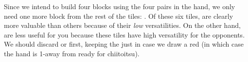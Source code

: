 \emj
Since we intend to build four blocks using the four pairs in the hand, we only need one more block from the rest of the tiles: {\large{}\dong\nan}. Of these six tiles, {\large\dong\nan{}} are clearly more valuable than others because of their \emph{low} versatilities. On the other hand, {\large{}} are less useful for you because these tiles have high versatility for the opponents. We should discard {\large{}} or {\large{}} first, keeping the {\large{}} just in case we draw a red {\large\rfd} (in which case the hand is 1-away from ready for {\jap chiitoitsu}).




